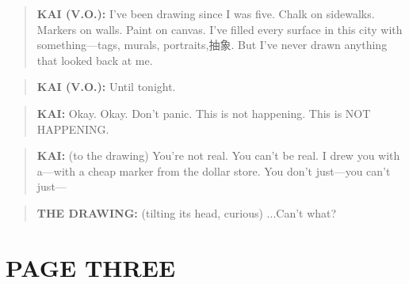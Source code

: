 \documentclass[
    language=english,
    doctype=comic-book,
    institution=none,
]{../../omnilatex}
\begin{document}
\vspace{0.5cm}

\begin{quote}
\textbf{KAI (V.O.):} I've been drawing since I was five. Chalk on sidewalks. Markers on walls. Paint on canvas. I've filled every surface in this city with something---tags, murals, portraits,抽象. But I've never drawn anything that looked back at me.
\end{quote}

\begin{quote}
\textbf{KAI (V.O.):} Until tonight.
\end{quote}

\begin{quote}
\textbf{KAI:} Okay. Okay. Don't panic. This is not happening. This is NOT HAPPENING.
\end{quote}

\begin{quote}
\textbf{KAI:} (to the drawing) You're not real. You can't be real. I drew you with a---with a cheap marker from the dollar store. You don't just---you can't just---
\end{quote}

\begin{quote}
\textbf{THE DRAWING:} (tilting its head, curious) ...Can't what?
\end{quote}

\chapter{PAGE THREE}
\end{document}
